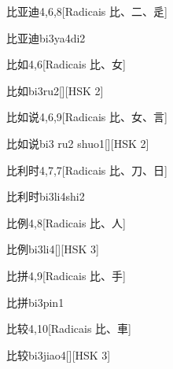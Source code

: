 \begin{entry}{比亚迪}{4,6,8}[Radicais ⽐、⼆、⾡]
  \begin{phonetics}{比亚迪}{bi3ya4di2}
  \end{phonetics}
\end{entry}

\begin{entry}{比如}{4,6}[Radicais ⽐、⼥]
  \begin{phonetics}{比如}{bi3ru2}[][HSK 2]
  \end{phonetics}
\end{entry}

\begin{entry}{比如说}{4,6,9}[Radicais ⽐、⼥、⾔]
  \begin{phonetics}{比如说}{bi3 ru2 shuo1}[][HSK 2]
  \end{phonetics}
\end{entry}

\begin{entry}{比利时}{4,7,7}[Radicais ⽐、⼑、⽇]
  \begin{phonetics}{比利时}{bi3li4shi2}
  \end{phonetics}
\end{entry}

\begin{entry}{比例}{4,8}[Radicais ⽐、⼈]
  \begin{phonetics}{比例}{bi3li4}[][HSK 3]
  \end{phonetics}
\end{entry}

\begin{entry}{比拼}{4,9}[Radicais ⽐、⼿]
  \begin{phonetics}{比拼}{bi3pin1}
  \end{phonetics}
\end{entry}

\begin{entry}{比较}{4,10}[Radicais ⽐、⾞]
  \begin{phonetics}{比较}{bi3jiao4}[][HSK 3]
  \end{phonetics}
\end{entry}

